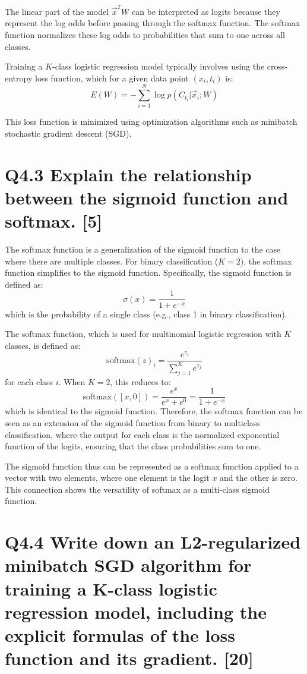 \documentclass[11pt]{article}
\begin{document}
The linear part of the model \( \vec{x}^TW \) can be interpreted as logits because they represent the log odds before passing through the softmax function. The softmax function normalizes these log odds to probabilities that sum to one across all classes.

Training a \( K \)-class logistic regression model typically involves using the cross-entropy loss function, which for a given data point \( (x_i, t_i) \) is:
\[
E(W) = -\sum_{i=1}^{N} \log p(C_{t_i} | \vec{x}_i; W)
\]

This loss function is minimized using optimization algorithms such as minibatch stochastic gradient descent (SGD).


\section{Q4.3 Explain the relationship between the sigmoid function and softmax. [5]}

The softmax function is a generalization of the sigmoid function to the case where there are multiple classes. For binary classification (\(K=2\)), the softmax function simplifies to the sigmoid function. Specifically, the sigmoid function is defined as:
\[
\sigma(x) = \frac{1}{1 + e^{-x}}
\]
which is the probability of a single class (e.g., class 1 in binary classification).

The softmax function, which is used for multinomial logistic regression with \(K\) classes, is defined as:
\[
\text{softmax}(z)_i = \frac{e^{z_i}}{\sum_{j=1}^{K} e^{z_j}}
\]
for each class \(i\). When \(K=2\), this reduces to:
\[
\text{softmax}([x, 0]) = \frac{e^x}{e^x + e^0} = \frac{1}{1 + e^{-x}}
\]
which is identical to the sigmoid function. Therefore, the softmax function can be seen as an extension of the sigmoid function from binary to multiclass classification, where the output for each class is the normalized exponential function of the logits, ensuring that the class probabilities sum to one.

The sigmoid function thus can be represented as a softmax function applied to a vector with two elements, where one element is the logit \(x\) and the other is zero. This connection shows the versatility of softmax as a multi-class sigmoid function.

\section{Q4.4 Write down an L2-regularized minibatch SGD algorithm for training a K-class logistic regression model, including the explicit formulas of the loss function and its gradient. [20]}
\end{document}
